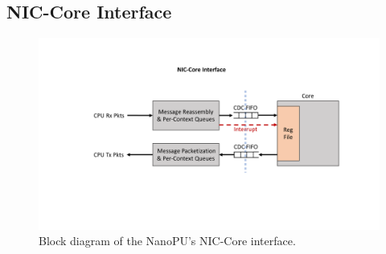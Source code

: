 \subsection{NIC-Core Interface}
\begin{figure}
  \includegraphics[width=\linewidth]{./figures/NIC-Core-Interface}
  \caption{Block diagram of the NanoPU's NIC-Core interface.}
  \label{fig:NIC-Core-Interface}
\end{figure}
